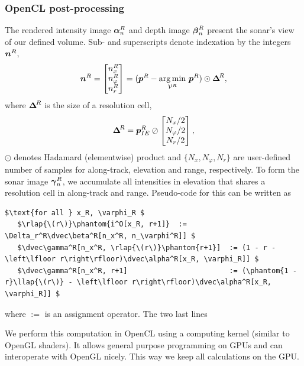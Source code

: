\subsubsection{OpenCL post-processing}

{
\renewcommand\v[1]{#1}

The rendered intensity image $\boldsymbol{\alpha}_n^R$ and depth image $\boldsymbol{\beta}_n^R$ present the sonar's view of our defined volume. Sub- and superscripts denote indexation by the integers $\boldsymbol{n}^R$,
%
\begin{align}
\dvec{n}^{\v{R}} = \bmat{n_x^{\v{R}}\\ n_\varphi^{\v{R}}\\ n_r^{\v{R}}} = (\dvec{p}^{\v{R}} - \underset{\mathcal{V}^R}{\mathrm{arg\,min}}\ \dvec{p}^{\v{R}}) \odot \dvec\Delta^{\!\v{R}},
\end{align}
%
where $\boldsymbol{\Delta}^{\!R}$ is the size of a resolution cell,
%
\begin{align}
\dvec\Delta^{\!\v{R}} = \dvec{p}_{IE}^{\v{R}} \oslash \bmat{N_x/2\\ N_\varphi/2\\ N_r/2},
\end{align}
%
$\odot$ denotes Hadamard (elementwise) product and $\{N_x, N_\varphi, N_r\}$ are user-defined number of samples for along-track, elevation and range, respectively. To form the sonar image $\boldsymbol{\gamma}_n^R$, we accumulate all intensities in elevation that shares a resolution cell in along-track and range. Pseudo-code for this can be written as
%
\lstset{language=bash, caption=Pseudo-code for combining the OpenGL intensity and depth image into a sonar image., label= }
\begin{lstlisting}
$\text{for all } x_R, \varphi_R $
   $\rlap{\(r\)}\phantom{i^O[x_R, r+1]}  := \Delta_r^R\dvec\beta^R[n_x^R, n_\varphi^R]] $
   $\dvec\gamma^R[n_x^R, \rlap{\(r\)}\phantom{r+1}]  := (1 - r - \left\lfloor r\right\rfloor)\dvec\alpha^R[x_R, \varphi_R]] $
   $\dvec\gamma^R[n_x^R, r+1]                        := (\phantom{1 - r}\llap{\(r\)} - \left\lfloor r\right\rfloor)\dvec\alpha^R[x_R, \varphi_R]] $
\end{lstlisting}%
%
where $:=$ is an assignment operator. The two last lines 

We perform this computation in OpenCL using a computing kernel (similar to OpenGL shaders). It allows general purpose programming on GPUs and can interoperate with OpenGL nicely. This way we keep all calculations on the GPU.


}
